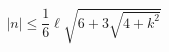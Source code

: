 \begin{equation}
\left| n\right| \leq \frac{1}{6}\ell \sqrt{6+3\sqrt{4+k^{2}}}  \label{nmax}
\end{equation}%
